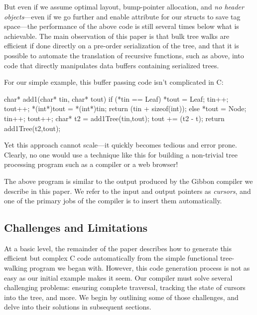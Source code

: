 \documentclass[a4paper,english]{lipics-v2016}
\newcommand{\treelang}{Gibbon\xspace} %
\begin{document}
But even if we assume optimal layout, bump-pointer allocation, and {\em no
  header objects}---even if we go further and enable  attribute
for our structs to save tag space---the performance of the above code is still
several times below what is achievable.  The main observation of this paper is
that bulk tree walks are efficient if done directly on a pre-order serialization
of the tree, and that it is possible to automate the translation of recursive
functions, such as  above, into code that directly manipulates data
buffers containing serialized trees.

For our simple example, this buffer passing code isn't complicated in C:
%
\begin{code}[language=c]
char* add1(char* tin, char* tout) {
  if (*tin == Leaf) {
    *tout = Leaf;
    tin++; tout++;
    *(int*)tout = *(int*)tin;
    return (tin + sizeof(int));
  } else {
    *tout = Node;
    tin++; tout++;
    char* t2 = add1Tree(tin,tout);
    tout += (t2 - t);
    return add1Tree(t2,tout);
  }
}
\end{code}
%
Yet this approach cannot scale---it quickly becomes tedious and error prone.
Clearly, no one would use a technique like this for building a
non-trivial tree processing program such as a compiler or a web browser!

The above program is similar to the output produced by the \treelang compiler we
describe in this paper.  We refer to the input and output pointers as {\em
  cursors}, and one of the primary jobs of the compiler is to insert
them automatically.



\subsection{Challenges and Limitations}
\label{sec:limitations}

At a basic level, the remainder of the paper describes how to generate
this efficient but complex C code automatically from the simple
functional tree-walking program we began with.
%
However, this code generation process is not as easy as our initial
example makes it seem. Our compiler must solve several challenging
problems: ensuring complete traversal, tracking the state of cursors
into the tree, and more. We begin by outlining some of those
challenges, and delve into their solutions in subsequent sections.
\end{document}
